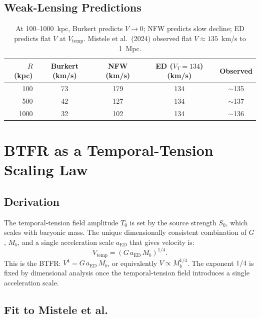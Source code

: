 \documentclass[12pt,letterpaper]{article}
\begin{document}
\subsection{Weak-Lensing Predictions}

\begin{table}[H]
\centering
\begin{tabular}{@{}rcccc@{}}
\toprule
$R$ (kpc) & Burkert (km/s) & NFW (km/s) & ED ($V_T=134$) (km/s) & Observed \\
\midrule
100 & 73 & 179 & 134 & $\sim$135 \\
500 & 42 & 127 & 134 & $\sim$137 \\
1000 & 32 & 102 & 134 & $\sim$136 \\
\bottomrule
\end{tabular}
\caption{At 100--1000~kpc, Burkert predicts $V \to 0$; NFW predicts slow decline; ED predicts flat $V$ at $V_{\mathrm{temp}}$. Mistele et al.\ (2024) observed flat $V \approx 135$~km/s to 1~Mpc.}
\end{table}

\section{BTFR as a Temporal-Tension Scaling Law}

\subsection{Derivation}

The temporal-tension field amplitude $T_0$ is set by the source strength $S_0$, which scales with baryonic mass. The unique dimensionally consistent combination of $G$, $M_b$, and a single acceleration scale $a_{\mathrm{ED}}$ that gives velocity is:
\begin{equation}
V_{\mathrm{temp}} = (G\,a_{\mathrm{ED}}\,M_b)^{1/4}. \label{eq:btfr}
\end{equation}
This is the BTFR: $V^4 = G\,a_{\mathrm{ED}}\,M_b$, or equivalently $V \propto M_b^{1/4}$. The exponent $1/4$ is fixed by dimensional analysis once the temporal-tension field introduces a single acceleration scale.

\subsection{Fit to Mistele et al.}
\end{document}

